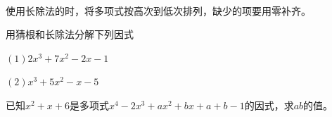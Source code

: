 \

\begin{att}
使用长除法的时，将多项式按高次到低次排列，缺少的项要用零补齐。
\end{att}
\begin{exercise}
    用猜根和长除法分解下列因式

    $(1)2x^3+7x^2-2x-1$

    $(2)x^3+5x^2-x-5$
\end{exercise}
\begin{exercise}
    已知$x^2+x+6$是多项式$x^4-2x^3+ax^2+bx+a+b-1$的因式，求$ab$的值。
\end{exercise}

\clearpage

\hw

